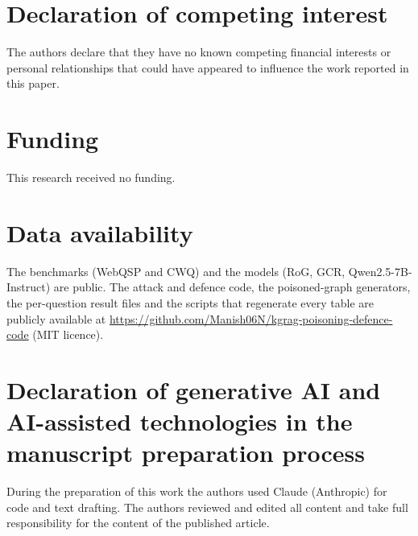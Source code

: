 \documentclass[preprint,12pt]{elsarticle}
\begin{document}
\section*{Declaration of competing interest}
The authors declare that they have no known competing financial interests or personal relationships that could have appeared to influence the work reported in this paper.

\section*{Funding}
This research received no funding.

\section*{Data availability}
The benchmarks (WebQSP and CWQ) and the models (RoG, GCR, Qwen2.5-7B-Instruct) are public. The attack and defence code, the poisoned-graph generators, the per-question result files and the scripts that regenerate every table are publicly available at \url{https://github.com/Manish06N/kgrag-poisoning-defence-code} (MIT licence).

\section*{Declaration of generative AI and AI-assisted technologies in the manuscript preparation process}
During the preparation of this work the authors used Claude (Anthropic) for code and text drafting. The authors reviewed and edited all content and take full responsibility for the content of the published article.
\end{document}
